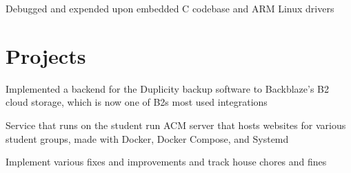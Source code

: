 \documentclass[letterpaper]{deedy-resume} %
\begin{document}
\begin{minipage}[t]{0.66\textwidth}



\begin{tightitemize}
\item Debugged and expended upon embedded C codebase and ARM Linux drivers
\end{tightitemize}

\sectionspace %


\section{Projects}


\begin{tightitemize}
\item Implemented a backend for the Duplicity backup software to Backblaze's B2
  cloud storage, which is now one of B2s most used integrations
\end{tightitemize}

\sectionspace %



\begin{tightitemize}
\item Service that runs on the student run ACM server that hosts websites for
  various student groups, made with Docker, Docker Compose, and Systemd
\end{tightitemize}

\sectionspace %



\begin{tightitemize}
\item Implement various fixes and improvements and track house chores and fines
\end{tightitemize}


\end{minipage}
\end{document}
